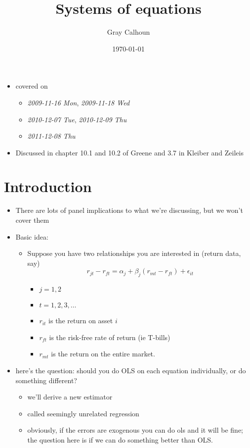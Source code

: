 \documentclass[11pt]{article}
\title{Systems of equations}
\author{Gray Calhoun}
\date{\today}
\begin{document}
\maketitle

\setcounter{tocdepth}{2}
\tableofcontents
\vspace*{1cm}
\begin{itemize}
\item covered on
\begin{itemize}
\item \textit{2009-11-16 Mon}, \textit{2009-11-18 Wed}
\item \textit{2010-12-07 Tue}, \textit{2010-12-09 Thu}
\item \textit{2011-12-08 Thu}
\end{itemize}
\item Discussed in chapter 10.1 and 10.2 of Greene and 3.7 in Kleiber
     and Zeileis
\end{itemize}
\section{Introduction}
\label{sec-1}

\begin{itemize}
\item There are lots of panel implications to what we're discussing,
      but we won't cover them
\item Basic idea:
\begin{itemize}
\item Suppose you have two relationships you are interested in
        (return data, say)
        \[r_{jt} - r_{ft} = \alpha_j + \beta_j (r_{mt} - r_{ft}) +
        \epsilon_{it}\]
\begin{itemize}
\item $j = 1,2$
\item $t = 1,2,3,\dots$
\item $r_{it}$ is the return on asset $i$
\item $r_{ft}$ is the risk-free rate of return (ie T-bills)
\item $r_{mt}$ is the return on the entire market.
\end{itemize}
\end{itemize}
\item here's the question: should you do OLS on each equation
      individually, or do something different?
\begin{itemize}
\item we'll derive a new estimator
\item called seemingly unrelated regression
\item obviously, if the errors are exogenous you can do ols and it
        will be fine; the question here is if we can do something
        better than OLS.
\end{itemize}
\end{itemize}
\end{document}
